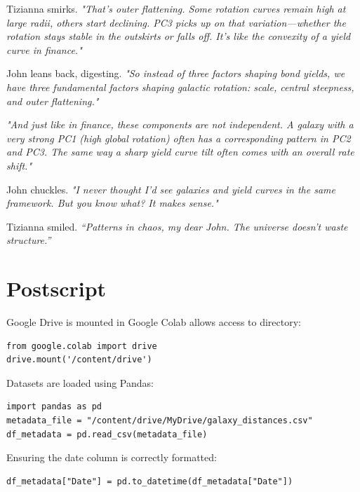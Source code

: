 \smallskip

Tizianna smirks. \textit{"That’s \textit{outer flattening}. Some rotation curves remain high at large radii, others start declining. PC3 picks up on that variation—whether the rotation stays stable in the outskirts or falls off. It’s like the convexity of a yield curve in finance."}

\smallskip

John leans back, digesting. \textit{"So instead of three factors shaping bond yields, we have three fundamental factors shaping galactic rotation: scale, central steepness, and outer flattening."}

\smallskip

\textit{"And just like in finance, these components are \textit{not independent}. A galaxy with a very strong PC1 (high global rotation) often has a corresponding pattern in PC2 and PC3. The same way a sharp yield curve tilt often comes with an overall rate shift."}

\smallskip

John chuckles. \textit{"I never thought I’d see galaxies and yield curves in the same framework. But you know what? It makes sense."}








Tizianna smiled. \textit{“Patterns in chaos, my dear John. The universe doesn’t waste structure.”} 
\section*{Postscript}
Google Drive is mounted in Google Colab allows access to directory:
\begin{lstlisting}
from google.colab import drive
drive.mount('/content/drive')
\end{lstlisting}
Datasets are loaded using Pandas:
\begin{lstlisting}
import pandas as pd
metadata_file = "/content/drive/MyDrive/galaxy_distances.csv"
df_metadata = pd.read_csv(metadata_file)
\end{lstlisting}
Ensuring the date column is correctly formatted:
\begin{lstlisting}
df_metadata["Date"] = pd.to_datetime(df_metadata["Date"])
\end{lstlisting}

